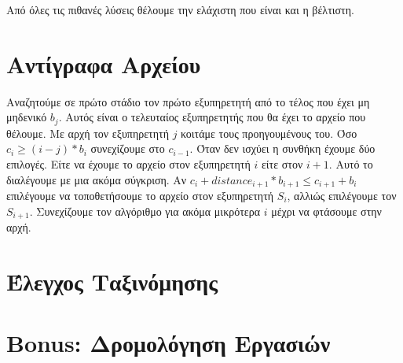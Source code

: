 \documentclass[a4paper,10pt]{article} \usepackage{anysize}
\begin{document}
Από όλες τις πιθανές λύσεις θέλουμε την ελάχιστη που είναι και η βέλτιστη.


\section{Αντίγραφα Αρχείου}
Αναζητούμε σε πρώτο στάδιο τον πρώτο εξυπηρετητή από το τέλος που έχει μη
μηδενικό $b_j$. Αυτός είναι ο τελευταίος εξυπηρετητής που θα έχει το αρχείο
που θέλουμε. Με αρχή τον εξυπηρετητή $j$ κοιτάμε τους προηγουμένους του. Όσο
$c_i \ge (i-j)*b_i$ συνεχίζουμε στο $c_{i-1}$. Όταν δεν ισχύει η
συνθήκη έχουμε δύο επιλογές. Είτε να έχουμε το αρχείο στον εξυπηρετητή
$i$ είτε στον $i+1$. Αυτό το διαλέγουμε με μια ακόμα σύγκριση. Αν
$c_i+distance_{i+1}*b_{i+1} \le c_{i+1}+b_i$ επιλέγουμε να τοποθετήσουμε το
αρχείο στον εξυπηρετητή $S_i$, αλλιώς επιλέγουμε τον $S_{i+1}$. Συνεχίζουμε
τον αλγόριθμο για ακόμα μικρότερα $i$ μέχρι να φτάσουμε στην αρχή.



\vspace{3cm}

\section{Έλεγχος Ταξινόμησης}


\vspace{3cm}

\section{Bonus: Δρομολόγηση Εργασιών}
\end{document}
